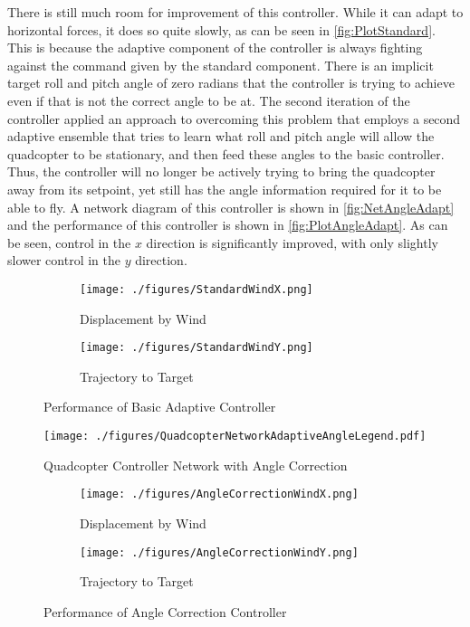 \documentclass[letterpaper,12pt,titlepage,oneside,final]{book}
\begin{document}
There is still much room for improvement of this controller. 
While it can adapt to horizontal forces, it does so quite slowly, as can be seen in \autoref{fig:PlotStandard}. 
This is because the adaptive component of the controller is always fighting against the command given by the standard component. 
There is an implicit target roll and pitch angle of zero radians that the controller is trying to achieve even if that is not the correct angle to be at. 
The second iteration of the controller applied an approach to overcoming this problem that employs a second adaptive ensemble that tries to learn what roll and pitch angle will allow the quadcopter to be stationary, and then feed these angles to the basic controller. 
Thus, the controller will no longer be actively trying to bring the quadcopter away from its setpoint, yet still has the angle information required for it to be able to fly. 
A network diagram of this controller is shown in \autoref{fig:NetAngleAdapt} and the performance of this controller is shown in \autoref{fig:PlotAngleAdapt}.
As can be seen, control in the $x$ direction is significantly improved, with only slightly slower control in the $y$ direction.

\begin{figure}
\centering
\begin{subfigure}[t]{0.48\textwidth}
\texttt{[image: ./figures/StandardWindX.png]} %
\caption{Displacement by Wind}
\end{subfigure}
\begin{subfigure}[t]{0.48\textwidth}
\texttt{[image: ./figures/StandardWindY.png]}
\caption{Trajectory to Target}
\end{subfigure}
\caption{Performance of Basic Adaptive Controller}
\label{fig:PlotStandard}
\end{figure}

\begin{figure}
\centering
\texttt{[image: ./figures/QuadcopterNetworkAdaptiveAngleLegend.pdf]} %
\caption{Quadcopter Controller Network with Angle Correction}
\label{fig:NetAngleAdapt}
\end{figure}

\begin{figure}
\centering
\begin{subfigure}[t]{0.48\textwidth}
\texttt{[image: ./figures/AngleCorrectionWindX.png]} %
\caption{Displacement by Wind}
\label{fig:PlotAngleAdaptA}
\end{subfigure}
\begin{subfigure}[t]{0.48\textwidth}
\texttt{[image: ./figures/AngleCorrectionWindY.png]}
\caption{Trajectory to Target}
\label{fig:PlotAngleAdaptB}
\end{subfigure}
\caption{Performance of Angle Correction Controller}
\label{fig:PlotAngleAdapt}
\end{figure}
\end{document}
